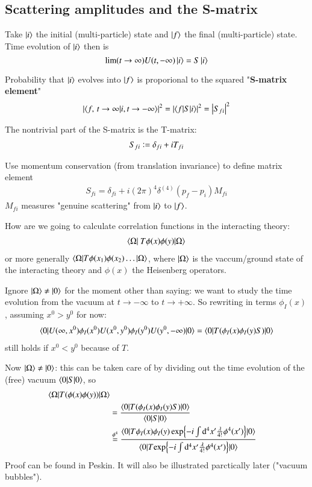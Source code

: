 \subsection{Scattering amplitudes and the S-matrix}
Take $\ket{i}$ the initial (multi-particle) state and $\ket{f}$ the final (multi-particle) state. Time evolution of $\ket{i}$ then is
$$\lim(t\rightarrow\infty)U(t,-\infty) \ket{i} = S \ket{i}$$

Probability that $\ket{i}$ evolves into $\ket{f}$ is proporional to the squared "\textbf{S-matrix element}"
\begin{align}
	\left|	\braket{f,\, t\to \infty | i, t\rightarrow - \infty}\right|^2 = \left| \braket{f|S|i} \right|^2 = \left| S_{fi} \right|^2
\end{align}

The nontrivial part of the S-matrix is the T-matrix:
\begin{align}
	S_{fi} \vcentcolon = \delta_{fi} + iT_{fi}
\end{align}

Use momentum conservation (from translation invariance) to define matrix element
\begin{align}
	S_{fi} = \delta_{fi} + i(2\pi)^4 \delta^{(4)}(p_f - p_i) M_{fi}
\end{align}
$M_{fi}$ measures "genuine scattering" from $\ket{i}$ to $\ket{f}$.

How are we going to calculate correlation functions in the interacting theory:
\begin{align}
	\braket{\Omega |  \ T \phi(x)\phi(y) | \Omega}	
\end{align}
or more generally $\braket{\Omega | T \phi(x_1)\phi(x_2)\dots | \Omega}$, where $\ket{\Omega}$ is the vaccum/ground state of the interacting theory and $\phi(x)$ the Heisenberg operators.

Ignore $\ket{\Omega} \neq \ket{0}$ for the moment other than saying: we want to study the time evolution from the vacuum at $t\rightarrow - \infty$ to $t \rightarrow + \infty$. So rewriting in terms $\phi_I(x)$, assuming $x^0 > y^0$ for now:
\begin{align}
	\braket{0 | U(\infty, x^0) \phi_I(x^0)  U(x^0, y^0) \phi_I(y^0)U(y^0, -\infty) | 0}  = \braket{0|T(\phi_I(x)\phi_I(y)S)|0}
\end{align}
still holds if $x^0 < y^0$ because of $T$.

Now $\ket{\Omega} \neq \ket{0}$: this can be taken care of by dividing out the time evolution of the (free) vacuum $\braket{0|S|0}$, so
\begin{align}
	\braket{\Omega | T(\phi(x)\phi(y))|\Omega} \notag\\
	&= \frac{\braket{0 | T(\phi_I(x)\phi_I(y)S)|0}}{\braket{0|S|0}} \\
	&\stackrel{\phi^4}{=} 
	\frac{\braket{0 | T {\phi_I(x)\phi_I(y)\exp{-i\int\dd^4x' \frac{\lambda}{4!}\phi^4(x')}}| 0}}
	{\braket{0 | T {\exp{-i\int\dd^4x' \frac{\lambda}{4!}\phi^4(x')}}| 0}
}\notag
\end{align}
Proof can be found in Peskin. It will also be illustrated parctically later ("vacuum bubbles").

